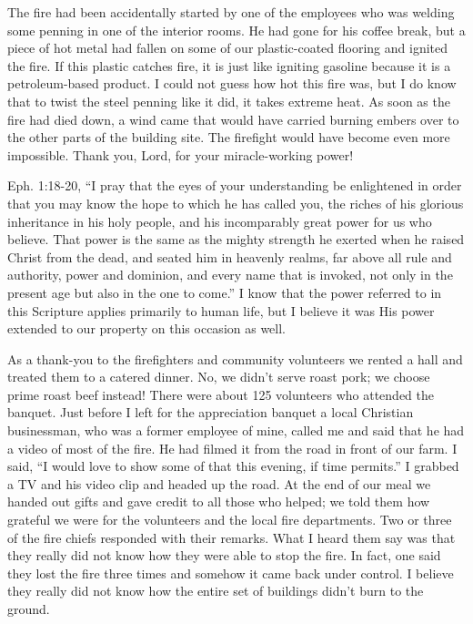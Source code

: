 \documentclass[oneside]{book}
\begin{document}
The fire had been accidentally started by one of the employees who was welding some penning in one of the interior rooms. He had gone for his coffee break, but a piece of hot metal had fallen on some of our plastic-coated flooring and ignited the fire. If this plastic catches fire, it is just like igniting gasoline because it is a petroleum-based product. I could not guess how hot this fire was, but I do know that to twist the steel penning like it did, it takes extreme heat. As soon as the fire had died down, a wind came that would have carried burning embers over to the other parts of the building site. The firefight would have become even more impossible. Thank you, Lord, for your miracle-working power! 

Eph. 1:18-20, “I pray that the eyes of your understanding be enlightened in order that you may know the hope to which he has called you, the riches of his glorious inheritance in his holy people, and his incomparably great power for us who believe. That power is the same as the mighty strength he exerted when he raised Christ from the dead, and seated him in heavenly realms, far above all rule and authority, power and dominion, and every name that is invoked, not only in the present age but also in the one to come.” I know that the power referred to in this Scripture applies primarily to human life, but I believe it was His power extended to our property on this occasion as well. 

As a thank-you to the firefighters and community volunteers we rented a hall and treated them to a catered dinner. No, we didn't serve roast pork; we choose prime roast beef instead! There were about 125 volunteers who attended the banquet. Just before I left for the appreciation banquet a local Christian businessman, who was a former employee of mine, called me and said that he had a video of most of the fire. He had filmed it from the road in front of our farm. I said, “I would love to show some of that this evening, if time permits.” I grabbed a TV and his video clip and headed up the road. At the end of our meal we handed out gifts and gave credit to all those who helped; we told them how grateful we were for the volunteers and the local fire departments. Two or three of the fire chiefs responded with their remarks. What I heard them say was that they really did not know how they were able to stop the fire. In fact, one said they lost the fire three times and somehow it came back under control. I believe they really did not know how the entire set of buildings didn’t burn to the ground.
\end{document}
